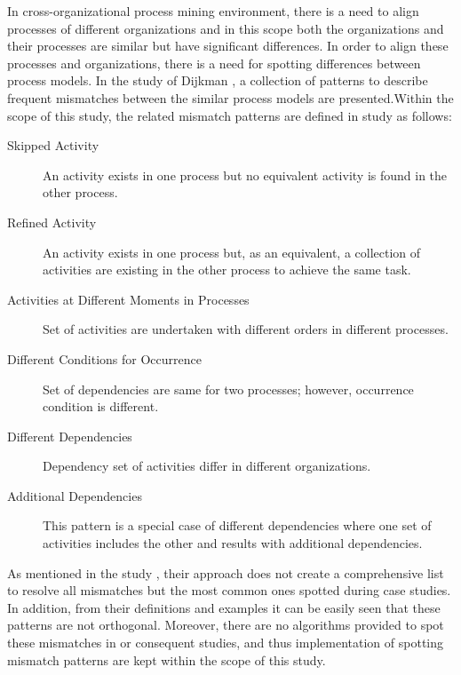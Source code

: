 In cross-organizational process mining environment, there is a need to align processes of different organizations and in this scope both the organizations and their processes are similar but have significant differences. In order to align these processes and organizations, there is a need for spotting differences between process models. In the study of Dijkman \cite{dijkman2007mismatch}, a collection of patterns to describe frequent mismatches between the similar process models are presented.Within the scope of this study, the related mismatch patterns are defined in study \cite{dijkman2007mismatch} as follows:
\begin{description}
  \item[Skipped Activity] An activity exists in one process but no equivalent activity is found in the other process.
  \item[Refined Activity] An activity exists in one process but, as an equivalent, a collection of activities are existing in the other process to achieve the same task.
  \item[Activities at Different Moments in Processes] Set of activities are undertaken with different orders in different processes.
  \item[Different Conditions for Occurrence] Set of dependencies are same for two processes; however, occurrence condition is different.
  \item[Different Dependencies] Dependency set of activities differ in different organizations.
  \item[Additional Dependencies] This pattern is a special case of different dependencies where one set of activities includes the other and results with additional dependencies.
\end{description}

As mentioned in the study \cite{dijkman2007mismatch}, their approach does not create a comprehensive list to resolve all mismatches but the most common ones spotted during case studies. In addition, from their definitions and examples it can be easily seen that these patterns are not orthogonal. Moreover, there are no algorithms provided to spot these mismatches in \cite{dijkman2007mismatch} or consequent studies, and thus implementation of spotting mismatch patterns are kept within the scope of this study.
